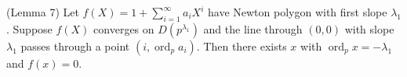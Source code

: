 (Lemma 7) Let $f(X) = 1 + \sum_{i=1}^\infty a_i X^i$ have Newton polygon with first slope $\lambda_1$. Suppose $f(X)$ converges on $D(p^{\lambda_1})$ and the line through $(0,0)$ with slope $\lambda_1$ passes through a point $(i,\operatorname{ord}_p a_i)$. Then there exists $x$ with $\operatorname{ord}_p x = -\lambda_1$ and $f(x) = 0$.